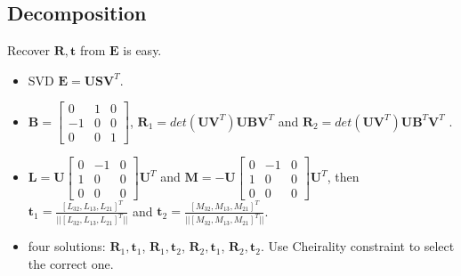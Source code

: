 \documentclass[a4paper]{report}
\begin{document}


\subsection{Decomposition}
Recover $\mathbf{R,t}$ from $\mathbf{E}$ is easy. 
\begin{itemize}
	\item SVD $\mathbf{E}=\mathbf{USV}^T$.
	\item  $\mathbf{B}=\left[
	\begin{matrix}
	0 & 1 & 0 \\ -1 & 0 & 0 \\ 0 & 0 & 1
	\end{matrix}
	\right]$, $\mathbf{R}_1=det(\mathbf{UV}^T)\mathbf{UBV}^T$ and $\mathbf{R}_2=det(\mathbf{UV}^T)\mathbf{UB}^T\mathbf{V}^T$ .
	\item $\mathbf{L}=\mathbf{U}\left[
	\begin{matrix}
	0 & -1 & 0 \\ 1 & 0 & 0 \\ 0 & 0 & 0
	\end{matrix}
	\right]\mathbf{U}^T$ and $\mathbf{M}=-\mathbf{U}\left[
	\begin{matrix}
	0 & -1 & 0 \\ 1 & 0 & 0 \\ 0 & 0 & 0
	\end{matrix}
	\right]\mathbf{U}^T$, then $\mathbf{t}_1=\frac{[L_{32}, L_{13}, L_{21}]^T}{||[L_{32}, L_{13}, L_{21}]^T||}$ and $\mathbf{t}_2=\frac{[M_{32}, M_{13}, M_{21}]^T}{||[M_{32}, M_{13}, M_{21}]^T||}$. 
	\item four solutions: $\mathbf{R}_1, \mathbf{t}_1$, $\mathbf{R}_1, \mathbf{t}_2$, $\mathbf{R}_2, \mathbf{t}_1$, $\mathbf{R}_2, \mathbf{t}_2$. Use Cheirality constraint to select the correct one.
\end{itemize}

 

\end{document}
